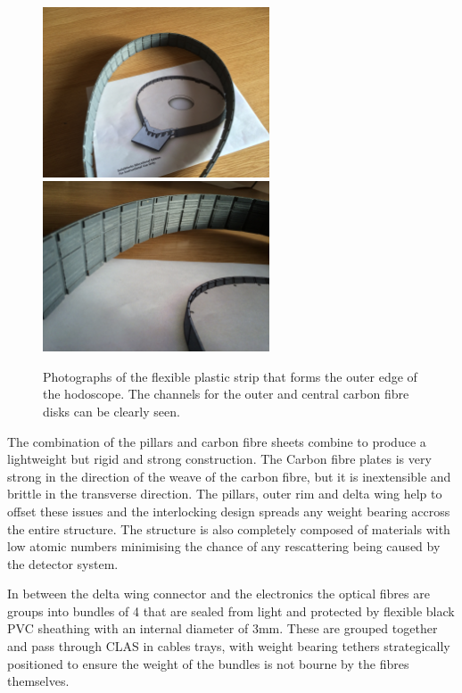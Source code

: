 \begin{figure}
	\centering
	\includegraphics[width=0.6\textwidth]{ImgChap1/enclosure_hodoscope6}
	\includegraphics[width=0.6\textwidth]{ImgChap1/enclosure_hodoscope4}
	\caption{Photographs of the flexible plastic strip that forms the outer edge of the hodoscope. The channels for the outer and central carbon fibre disks can be clearly seen. }
	\label{OuterBelt}
\end{figure}

The combination of the pillars and carbon fibre sheets combine to produce a lightweight but rigid and strong construction. The Carbon fibre plates is very strong in the direction of the weave of the carbon fibre, but it is inextensible and brittle in the transverse direction. The pillars, outer rim and delta wing help to offset these issues and the interlocking design spreads any weight bearing accross the entire structure. The structure is also completely composed of materials with low atomic numbers minimising the chance of any rescattering being caused by the detector system.

In between the delta wing connector and the electronics the optical fibres are groups into bundles of 4 that are sealed from light and protected by flexible black PVC sheathing with an internal diameter of 3mm. These are grouped together and pass through CLAS in cables trays, with weight bearing tethers strategically positioned to ensure the weight of the bundles is not bourne by the fibres themselves.


